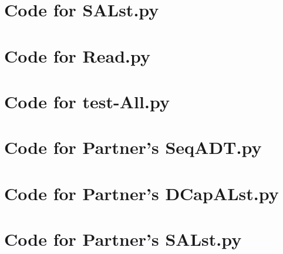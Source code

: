 \documentclass[12pt]{article}
\begin{document}
\noindent 

\newpage

\section{Code for SALst.py}

\noindent 

\newpage

\section{Code for Read.py}

\noindent 

\newpage

\section{Code for test-All.py}

\noindent 

\newpage

\section{Code for Partner's SeqADT.py}

\noindent 

\newpage

\section{Code for Partner's DCapALst.py}

\noindent 

\newpage

\section{Code for Partner's SALst.py}

\noindent 
\end{document}
